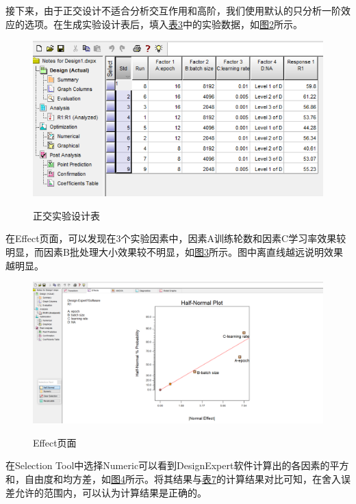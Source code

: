 \documentclass[UTF8]{ctexart}
\begin{document}
	接下来，由于正交设计不适合分析交互作用和高阶，我们使用默认的只分析一阶效应的选项。在生成实验设计表后，填入\hyperref[Chart.3]{表3}中的实验数据，如\hyperref[Fig.2]{图2}所示。
	
	\begin{figure}[htbp]
		\centering
		\caption{正交实验设计表}
		\includegraphics[width=1.0\textwidth]{pic5.png}
		\label{Fig.2}
	\end{figure}
	
	在Effect页面，可以发现在3个实验因素中，因素A训练轮数和因素C学习率效果较明显，而因素B批处理大小效果较不明显，如\hyperref[Fig.3]{图3}所示。图中离直线越远说明效果越明显。
	
	\begin{figure}[htbp]
		\centering
		\caption{Effect页面}
		\includegraphics[width=1.0\textwidth]{pic6.png}
		\label{Fig.3}
	\end{figure}

	在Selection Tool中选择Numeric可以看到DesignExpert软件计算出的各因素的平方和，自由度和均方差，如\hyperref[Fig.4]{图4}所示。将其结果与\hyperref[Chart.7]{表7}的计算结果对比可知，在舍入误差允许的范围内，可以认为计算结果是正确的。
	
\end{document}
